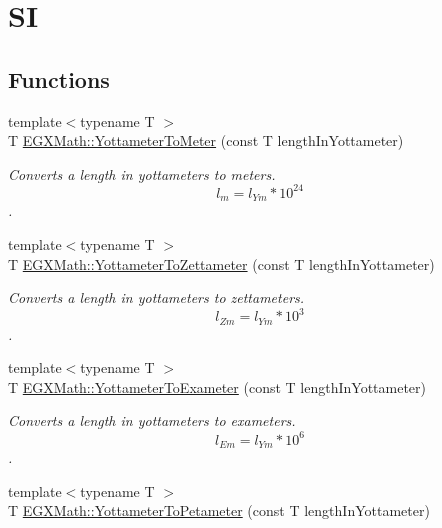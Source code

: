 \hypertarget{group___e_g_x_math-_conversions-_length_conversions-_yottameter-_s_i}{}\section{SI}
\label{group___e_g_x_math-_conversions-_length_conversions-_yottameter-_s_i}
\subsection*{Functions}
\begin{DoxyCompactItemize}
\item 
{\footnotesize template$<$typename T $>$ }\\T \mbox{\hyperlink{group___e_g_x_math-_conversions-_length_conversions-_yottameter-_s_i_ga01c4f2e699cc2b062bdd2e81073a7ef2}{E\+G\+X\+Math\+::\+Yottameter\+To\+Meter}} (const T length\+In\+Yottameter)
\begin{DoxyCompactList}\small\item\em Converts a length in yottameters to meters. \[ l_{m}=l_{Ym} * 10^{24} \]. \end{DoxyCompactList}\item 
{\footnotesize template$<$typename T $>$ }\\T \mbox{\hyperlink{group___e_g_x_math-_conversions-_length_conversions-_yottameter-_s_i_gaec75915fd3b267aeff37cc104cfb3e9a}{E\+G\+X\+Math\+::\+Yottameter\+To\+Zettameter}} (const T length\+In\+Yottameter)
\begin{DoxyCompactList}\small\item\em Converts a length in yottameters to zettameters. \[ l_{Zm}=l_{Ym} * 10^{3} \]. \end{DoxyCompactList}\item 
{\footnotesize template$<$typename T $>$ }\\T \mbox{\hyperlink{group___e_g_x_math-_conversions-_length_conversions-_yottameter-_s_i_ga596bb0befe41a04cc5e193786ccc8de7}{E\+G\+X\+Math\+::\+Yottameter\+To\+Exameter}} (const T length\+In\+Yottameter)
\begin{DoxyCompactList}\small\item\em Converts a length in yottameters to exameters. \[ l_{Em}=l_{Ym} * 10^{6} \]. \end{DoxyCompactList}\item 
{\footnotesize template$<$typename T $>$ }\\T \mbox{\hyperlink{group___e_g_x_math-_conversions-_length_conversions-_yottameter-_s_i_gaf4b5d397ea5debc0bd5195ad3a5c23d5}{E\+G\+X\+Math\+::\+Yottameter\+To\+Petameter}} (const T length\+In\+Yottameter)

\end{DoxyCompactItemize}
